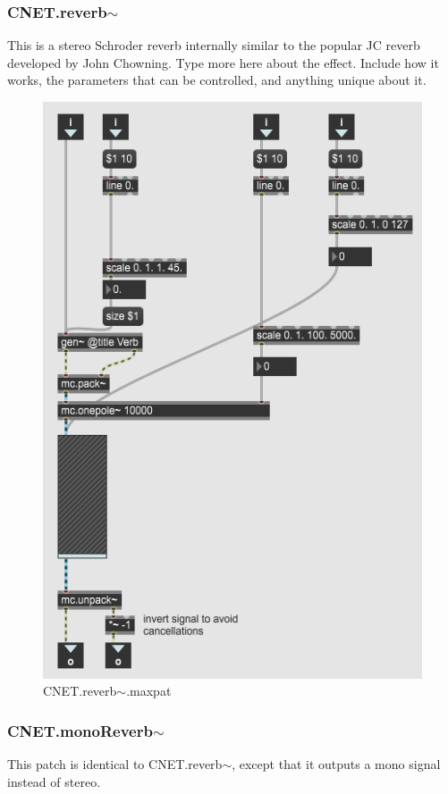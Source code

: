\subsubsection{CNET.reverb$\sim$}
This is a stereo Schroder reverb internally similar to the popular JC reverb developed by John Chowning. Type more here about the effect. Include how it works, the parameters that can be controlled, and anything unique about it. 

\begin{figure}
    \centering
    \includegraphics{diagrams/maxPatches/CNET.reverb~.png}
    \caption{CNET.reverb$\sim$.maxpat}
    \label{fig:my_label}
\end{figure}

\subsubsection{CNET.monoReverb$\sim$}
This patch is identical to CNET.reverb$\sim$, except that it outputs a mono signal instead of stereo.

